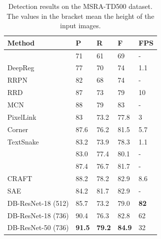 \documentclass[letterpaper]{article} %
\begin{document}
\begin{table}[ht]
\centering
\caption{Detection results on the MSRA-TD500 dataset. The values in the bracket mean the height of the input images.}
\begin{tabularx}{1.0\linewidth}{@{}l*{4}X@{}}
\toprule
Method        & P             & R             & F             & FPS         \\ \midrule
\cite{he2016text}          & 71            & 61            & 69            & -         \\ 
DeepReg~\cite{deepdirect}       & 77            & 70            & 74            & 1.1         \\ 
RRPN~\cite{rrpn}          & 82            & 68            & 74            & -         \\ 
RRD~\cite{liao2018rotation}           & 87            & 73            & 79            & 10          \\ 
MCN~\cite{mcn}          & 88            & 79            & 83            & -         \\ 
PixelLink~\cite{deng2018pixellink}     & 83            & 73.2          & 77.8          & 3           \\ 
Corner~\cite{lyu2018multi}    & 87.6          & 76.2          & 81.5          & 5.7         \\ 
TextSnake~\cite{long2018textsnake}     & 83.2          & 73.9          & 78.3          & 1.1         \\ 
\cite{xue2018accurate}         & 83.0          & 77.4          & 80.1          & -       \\ 
\cite{MSR}     & 87.4          & 76.7          & 81.7          & -       \\   
CRAFT~\cite{craft}         & 88.2          & 78.2          & 82.9          & 8.6       \\ 
SAE~\cite{tian2019learning}        & 84.2          & 81.7          & 82.9          & -       \\ 
\midrule  
DB-ResNet-18 (512) & 85.7          & 73.2          & 79.0          & \textbf{82} \\ 
DB-ResNet-18 (736) & 90.4          & 76.3          & 82.8          & 62 \\ 
DB-ResNet-50 (736) & \textbf{91.5} & \textbf{79.2} & \textbf{84.9} & 32          \\  \bottomrule
\end{tabularx}
\label{tab:td500}
\end{table}
\end{document}
